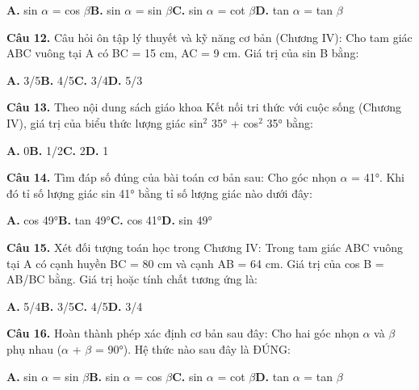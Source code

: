 \documentclass[11pt,a4paper]{article}
\begin{document}
\hspace*{1.5em}\textbf{A.} sin $\alpha$ = cos $\beta$\quad\quad \textbf{B.} sin $\alpha$ = sin $\beta$\quad\quad \textbf{C.} sin $\alpha$ = cot $\beta$\quad\quad \textbf{D.} tan $\alpha$ = tan $\beta$\par\vspace{2pt}
\textbf{\color{primary} Câu 12.} Câu hỏi ôn tập lý thuyết và kỹ năng cơ bản (Chương IV): Cho tam giác ABC vuông tại A có BC = 15 cm, AC = 9 cm. Giá trị của sin B bằng:\par
\hspace*{1.5em}\textbf{A.} 3/5\quad\quad \textbf{B.} 4/5\quad\quad \textbf{C.} 3/4\quad\quad \textbf{D.} 5/3\par\vspace{2pt}
\textbf{\color{primary} Câu 13.} Theo nội dung sách giáo khoa Kết nối tri thức với cuộc sống (Chương IV), giá trị của biểu thức lượng giác sin$^2$ 35° + cos$^2$ 35° bằng:\par
\hspace*{1.5em}\textbf{A.} 0\quad\quad \textbf{B.} 1/2\quad\quad \textbf{C.} 2\quad\quad \textbf{D.} 1\par\vspace{2pt}
\textbf{\color{primary} Câu 14.} Tìm đáp số đúng của bài toán cơ bản sau: Cho góc nhọn $\alpha$ = 41°. Khi đó tỉ số lượng giác sin 41° bằng tỉ số lượng giác nào dưới đây:\par
\hspace*{1.5em}\textbf{A.} cos 49°\quad\quad \textbf{B.} tan 49°\quad\quad \textbf{C.} cos 41°\quad\quad \textbf{D.} sin 49°\par\vspace{2pt}
\textbf{\color{primary} Câu 15.} Xét đối tượng toán học trong Chương IV: Trong tam giác ABC vuông tại A có cạnh huyền BC = 80 cm và cạnh AB = 64 cm. Giá trị của cos B = AB/BC bằng. Giá trị hoặc tính chất tương ứng là:\par
\hspace*{1.5em}\textbf{A.} 5/4\quad\quad \textbf{B.} 3/5\quad\quad \textbf{C.} 4/5\quad\quad \textbf{D.} 3/4\par\vspace{2pt}
\textbf{\color{primary} Câu 16.} Hoàn thành phép xác định cơ bản sau đây: Cho hai góc nhọn $\alpha$ và $\beta$ phụ nhau ($\alpha$ + $\beta$ = 90°). Hệ thức nào sau đây là ĐÚNG:\par
\hspace*{1.5em}\textbf{A.} sin $\alpha$ = sin $\beta$\quad\quad \textbf{B.} sin $\alpha$ = cos $\beta$\quad\quad \textbf{C.} sin $\alpha$ = cot $\beta$\quad\quad \textbf{D.} tan $\alpha$ = tan $\beta$\par\vspace{2pt}
\end{document}
